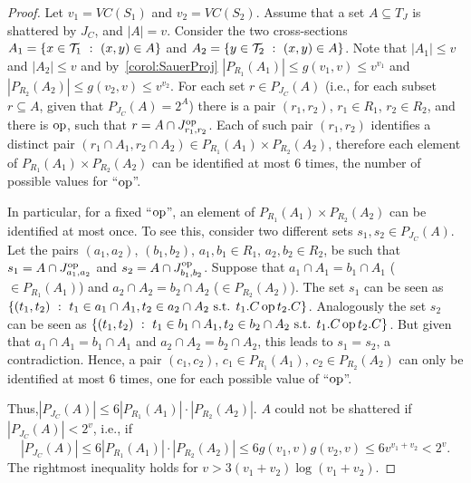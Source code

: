 \begin{proof}
  Let $v_1=VC(S_1)$ and $v_2=VC(S_2)$. Assume that a set $A\subseteq T_J$ is
  shattered by $J_C$, and $|A|=v$.  Consider the two cross-sections $A_1 =
  \{x\in {\cal T}_1 ~:~ (x,y)\in A\}$ and $A_2 = \{y\in {\cal T}_2 ~:~ (x,y)\in A\}$.
  Note that $|A_1|\leq v$ and $|A_2|\leq v$ and by~\ref{corol:SauerProj}
  $|P_{R_1} (A_1)|\leq g(v_1,v)\le v^{v_1}$ and $|P_{R_2}
  (A_2)|\leq g(v_2,v) \le v^{v_2}$. For each set $r \in
  P_{J_C}(A)$ (i.e., for each subset $r\subseteq A$, given that
  $P_{J_C}(A)=2^A$)  there is a pair $(r_1,r_2)$, $r_1\in R_1$, $r_2\in R_2$,
  and there is $\operatorname{op}$, such that $r = A \cap J^{\operatorname{op}}_{r_1,r_2}$. Each of such
  pair $(r_1,r_2)$ identifies a distinct pair $(r_1\cap A_1, r_2\cap A_2) \in
  P_{R_1}(A_1)\times P_{R_2}(A_2)$, therefore each element of
  $P_{R_1}(A_1)\times P_{R_2}(A_2)$ can be identified at most $6$ times, the
  number of possible values for ``$\operatorname{op}$''. 

  In particular, for a fixed ``$\operatorname{op}$'', an element of $P_{R_1}(A_1)\times
  P_{R_2}(A_2)$ can be identified at most once.  To see this, consider two
  different sets $s_1, s_2 \in P_{J_C}(A)$. Let the pairs $(a_1,a_2)$,
  $(b_1,b_2)$, $a_1,b_1\in R_1$, $a_2,b_2\in R_2$, be such that $s_1 = A \cap
  J^{\operatorname{op}}_{a_1,a_2}$ and $s_2 = A \cap J^{\operatorname{op}}_{b_1,b_2}$. Suppose that $a_1\cap
  A_1 = b_1\cap A_1$  ($\in P_{R_1}(A_1)$) and $ a_2 \cap A_2 = b_2 \cap A_2$
  ($\in P_{R_2}(A_2)$). The set $s_1$ can be seen as $\{(t_1,t_2) ~:~ t_1\in
  a_1\cap A_1, t_2\in a_2\cap A_2 \mbox{ s.t.  } t_1.C \operatorname{op} t_2.C\}$. Analogously
  the set $s_2$ can be seen as $\{(t_1,t_2) ~:~ t_1\in b_1\cap A_1, t_2\in
  b_2\cap A_2 \mbox{ s.t. } t_1.C \operatorname{op} t_2.C\}$. But given that $a_1\cap A_1 =
  b_1\cap A_1$ and $ a_2 \cap A_2 = b_2 \cap A_2$, this leads to $s_1=s_2$, a
  contradiction. Hence, a pair $(c_1,c_2)$, $c_1\in P_{R_1}(A_1)$, $c_2\in
  P_{R_2}(A_2)$ can only be identified at most $6$ times, one for each possible
  value of ``$\operatorname{op}$''.  

  Thus,$ |P_{J_C} (A)|\leq 6|P_{R_1} (A_1)|\cdot |P_{R_2} (A_2)|.$ $A$ could not
  be shattered if $|P_{J_C}(A)|< 2^v$, i.e., if
  \[
  |P_{J_C}(A)|\leq 6|P_{R_1} (A_1)|\cdot |P_{R_2} (A_2)|\leq
  6g(v_1,v)g(v_2,v)\leq 6v^{v_1+v_2} < 2^v.
  \]
  The rightmost inequality holds for $v> 3(v_1+v_2)\log(v_1+v_2)$.
\end{proof}


